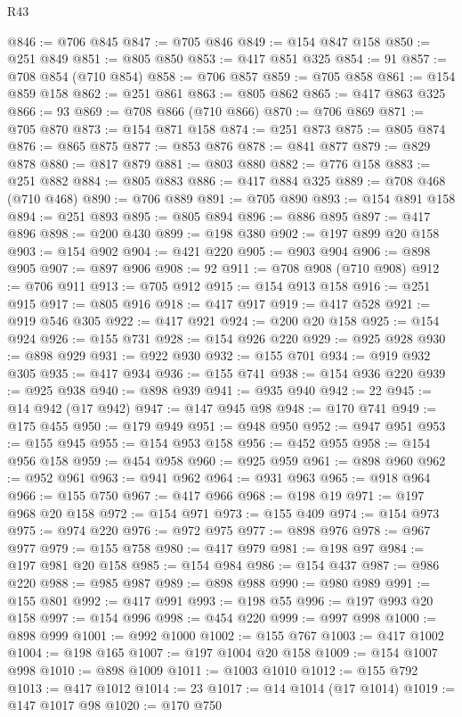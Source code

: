 \begin{lexlean}{R43}
\begin{coremodule}
@846 := @706 @845
@847 := @705 @846
@849 := @154 @847 @158
@850 := @251 @849
@851 := @805 @850
@853 := @417 @851 @325
@854 := 91
@857 := @708 @854 (@710 @854)
@858 := @706 @857
@859 := @705 @858
@861 := @154 @859 @158
@862 := @251 @861
@863 := @805 @862
@865 := @417 @863 @325
@866 := 93
@869 := @708 @866 (@710 @866)
@870 := @706 @869
@871 := @705 @870
@873 := @154 @871 @158
@874 := @251 @873
@875 := @805 @874
@876 := @865 @875
@877 := @853 @876
@878 := @841 @877
@879 := @829 @878
@880 := @817 @879
@881 := @803 @880
@882 := @776 @158
@883 := @251 @882
@884 := @805 @883
@886 := @417 @884 @325
@889 := @708 @468 (@710 @468)
@890 := @706 @889
@891 := @705 @890
@893 := @154 @891 @158
@894 := @251 @893
@895 := @805 @894
@896 := @886 @895
@897 := @417 @896
@898 := @200 @430
@899 := @198 @380
@902 := @197 @899 @20 @158
@903 := @154 @902
@904 := @421 @220
@905 := @903 @904
@906 := @898 @905
@907 := @897 @906
@908 := 92
@911 := @708 @908 (@710 @908)
@912 := @706 @911
@913 := @705 @912
@915 := @154 @913 @158
@916 := @251 @915
@917 := @805 @916
@918 := @417 @917
@919 := @417 @528
@921 := @919 @546 @305
@922 := @417 @921
@924 := @200 @20 @158
@925 := @154 @924
@926 := @155 @731
@928 := @154 @926 @220
@929 := @925 @928
@930 := @898 @929
@931 := @922 @930
@932 := @155 @701
@934 := @919 @932 @305
@935 := @417 @934
@936 := @155 @741
@938 := @154 @936 @220
@939 := @925 @938
@940 := @898 @939
@941 := @935 @940
@942 := 22
@945 := @14 @942 (@17 @942)
@947 := @147 @945 @98
@948 := @170 @741
@949 := @175 @455
@950 := @179 @949
@951 := @948 @950
@952 := @947 @951
@953 := @155 @945
@955 := @154 @953 @158
@956 := @452 @955
@958 := @154 @956 @158
@959 := @454 @958
@960 := @925 @959
@961 := @898 @960
@962 := @952 @961
@963 := @941 @962
@964 := @931 @963
@965 := @918 @964
@966 := @155 @750
@967 := @417 @966
@968 := @198 @19
@971 := @197 @968 @20 @158
@972 := @154 @971
@973 := @155 @409
@974 := @154 @973
@975 := @974 @220
@976 := @972 @975
@977 := @898 @976
@978 := @967 @977
@979 := @155 @758
@980 := @417 @979
@981 := @198 @97
@984 := @197 @981 @20 @158
@985 := @154 @984
@986 := @154 @437
@987 := @986 @220
@988 := @985 @987
@989 := @898 @988
@990 := @980 @989
@991 := @155 @801
@992 := @417 @991
@993 := @198 @55
@996 := @197 @993 @20 @158
@997 := @154 @996
@998 := @454 @220
@999 := @997 @998
@1000 := @898 @999
@1001 := @992 @1000
@1002 := @155 @767
@1003 := @417 @1002
@1004 := @198 @165
@1007 := @197 @1004 @20 @158
@1009 := @154 @1007 @998
@1010 := @898 @1009
@1011 := @1003 @1010
@1012 := @155 @792
@1013 := @417 @1012
@1014 := 23
@1017 := @14 @1014 (@17 @1014)
@1019 := @147 @1017 @98
@1020 := @170 @750

\end{coremodule}
\end{lexlean}
